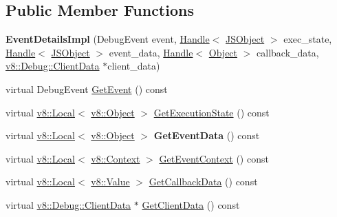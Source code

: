 \subsection*{Public Member Functions}
\begin{DoxyCompactItemize}
\item 
{\bfseries Event\+Details\+Impl} (Debug\+Event event, \hyperlink{classv8_1_1internal_1_1_handle}{Handle}$<$ \hyperlink{classv8_1_1internal_1_1_j_s_object}{J\+S\+Object} $>$ exec\+\_\+state, \hyperlink{classv8_1_1internal_1_1_handle}{Handle}$<$ \hyperlink{classv8_1_1internal_1_1_j_s_object}{J\+S\+Object} $>$ event\+\_\+data, \hyperlink{classv8_1_1internal_1_1_handle}{Handle}$<$ \hyperlink{classv8_1_1internal_1_1_object}{Object} $>$ callback\+\_\+data, \hyperlink{classv8_1_1_debug_1_1_client_data}{v8\+::\+Debug\+::\+Client\+Data} $\ast$client\+\_\+data)\hypertarget{classv8_1_1internal_1_1_event_details_impl_a036fc63c4a28bcc137400a11deba3424}{}\label{classv8_1_1internal_1_1_event_details_impl_a036fc63c4a28bcc137400a11deba3424}

\item 
virtual Debug\+Event \hyperlink{classv8_1_1internal_1_1_event_details_impl_a135085e7265cc9932ad6065649d6ffef}{Get\+Event} () const 
\item 
virtual \hyperlink{classv8_1_1_local}{v8\+::\+Local}$<$ \hyperlink{classv8_1_1_object}{v8\+::\+Object} $>$ \hyperlink{classv8_1_1internal_1_1_event_details_impl_ad58648fb347ec33930390d78a54d9def}{Get\+Execution\+State} () const 
\item 
virtual \hyperlink{classv8_1_1_local}{v8\+::\+Local}$<$ \hyperlink{classv8_1_1_object}{v8\+::\+Object} $>$ {\bfseries Get\+Event\+Data} () const \hypertarget{classv8_1_1internal_1_1_event_details_impl_a58d4604a008f9fb7a414a91dfb7744dd}{}\label{classv8_1_1internal_1_1_event_details_impl_a58d4604a008f9fb7a414a91dfb7744dd}

\item 
virtual \hyperlink{classv8_1_1_local}{v8\+::\+Local}$<$ \hyperlink{classv8_1_1_context}{v8\+::\+Context} $>$ \hyperlink{classv8_1_1internal_1_1_event_details_impl_a3125bc51e53d62ab3dc967cb16a4eedb}{Get\+Event\+Context} () const 
\item 
virtual \hyperlink{classv8_1_1_local}{v8\+::\+Local}$<$ \hyperlink{classv8_1_1_value}{v8\+::\+Value} $>$ \hyperlink{classv8_1_1internal_1_1_event_details_impl_a34b2e3cdc3ef2ad14761b85af5ef174b}{Get\+Callback\+Data} () const 
\item 
virtual \hyperlink{classv8_1_1_debug_1_1_client_data}{v8\+::\+Debug\+::\+Client\+Data} $\ast$ \hyperlink{classv8_1_1internal_1_1_event_details_impl_a562a0107f0d37a400eaf92031d829218}{Get\+Client\+Data} () const 
\end{DoxyCompactItemize}
